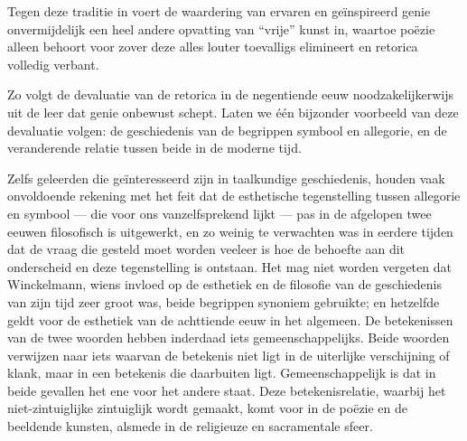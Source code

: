 Tegen deze traditie in voert de waardering van ervaren en geïnspireerd genie onvermijdelijk een heel andere opvatting van ``vrije'' kunst in, waartoe poëzie alleen behoort voor zover deze alles louter toevalligs elimineert en retorica volledig verbant.

Zo volgt de devaluatie van de retorica in de negentiende eeuw noodzakelijkerwijs uit de leer dat genie onbewust schept. Laten we één bijzonder voorbeeld van deze devaluatie volgen: de geschiedenis van de begrippen symbool en allegorie, en de veranderende relatie tussen beide in de moderne tijd.

Zelfs geleerden die geïnteresseerd zijn in taalkundige geschiedenis, houden vaak onvoldoende rekening met het feit dat de esthetische tegenstelling tussen allegorie en symbool — die voor ons vanzelfsprekend lijkt — pas in de afgelopen twee eeuwen filosofisch is uitgewerkt, en zo weinig te verwachten was in eerdere tijden dat de vraag die gesteld moet worden veeleer is hoe de behoefte aan dit onderscheid en deze tegenstelling is ontstaan. Het mag niet worden vergeten dat Winckelmann, wiens invloed op de esthetiek en de filosofie van de geschiedenis van zijn tijd zeer groot was, beide begrippen synoniem gebruikte; en hetzelfde geldt voor de esthetiek van de achttiende eeuw in het algemeen. De betekenissen van de twee woorden hebben inderdaad iets gemeenschappelijks. Beide woorden verwijzen naar iets waarvan de betekenis niet ligt in de uiterlijke verschijning of klank, maar in een betekenis die daarbuiten ligt. Gemeenschappelijk is dat in beide gevallen het ene voor het andere staat. Deze betekenisrelatie, waarbij het niet-zintuiglijke zintuiglijk wordt gemaakt, komt voor in de poëzie en de beeldende kunsten, alsmede in de religieuze en sacramentale sfeer.

